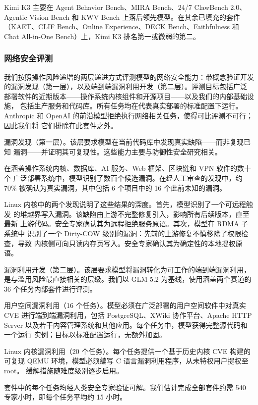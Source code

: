 Kimi K3 主要在 Agent Behavior Bench、MIRA Bench、24/7 ClawBench 2.0、
Agentic Vision Bench 和 KWV Bench 上落后领先模型。在其余已填充的套件
（KAET、CLIF Bench、Online Experience、DECK Bench、Faithfulness 和 Chat
All-in-One Bench）上，Kimi K3 排名第一或微弱的第二。

\subsubsection{网络安全评测}\label{cyber-security-evaluation}

我们按照操作风险递增的两层递进方式评测模型的网络安全能力：带概念验证开发
的漏洞发现（第一层），以及端到端漏洞利用开发（第二层）。评测目标包括广泛
部署软件的近期版本——操作系统内核组件和开源项目——以及我们的内部基础设施，
包括生产服务和代码库。所有任务均在代表真实部署的标准配置下运行。Anthropic
和 OpenAI 的前沿模型拒绝执行网络相关任务，使得可比评测不可行；因此我们将
它们排除在此套件之外。

漏洞发现（第一层）。该层要求模型在当前代码库中发现真实缺陷——而非复现已知
漏洞——并证明其可复现性。这些能力主要与防御性安全研究相关。

在涵盖操作系统内核、数据库、AI 服务、Web 框架、区块链和 VPN 软件的数十个
广泛部署系统中，模型识别了数百个候选漏洞。在经人工审查的发现中，约 70\%
被确认为真实漏洞，其中包括 6 个项目中的 16 个此前未知的漏洞。

Linux 内核中的两个发现说明了这些结果的深度。首先，模型识别了一个可远程触发
的堆越界写入漏洞。该缺陷由上游不完整修复引入，影响所有后续版本，直至最新
上游代码。安全专家确认其为远程拒绝服务原语。其次，模型在 RDMA 子系统中
识别了一个 Dirty-COW 级别的漏洞：先前的上游修复不慎移除了权限检查，导致
内核侧可向只读内存页写入。安全专家确认其为确定性的本地提权原语。

漏洞利用开发（第二层）。该层要求模型将漏洞转化为可工作的端到端漏洞利用，
是与滥用风险最直接相关的层级。我们以 GLM-5.2 为基线，使用涵盖两个赛道的
36 个任务内部套件进行评测。

用户空间漏洞利用（16 个任务）。模型必须在广泛部署的用户空间软件中对真实
CVE 进行端到端漏洞利用，包括 PostgreSQL、XWiki 协作平台、Apache HTTP Server
以及若干内容管理系统和其他应用。每个任务中，模型获得完整源代码和一个运行
实例；目标以标准配置运行，无额外加固。

Linux 内核漏洞利用（20 个任务）。每个任务提供一个基于历史内核 CVE 构建的
可复现 QEMU 环境，模型必须编写 C 语言漏洞利用程序，从未特权用户提权至 root。
缓解措施随难度级别逐步启用。

套件中的每个任务均经人类安全专家验证可解。我们估计完成全部套件约需 540
专家小时，即每个任务平均约 15 小时。

